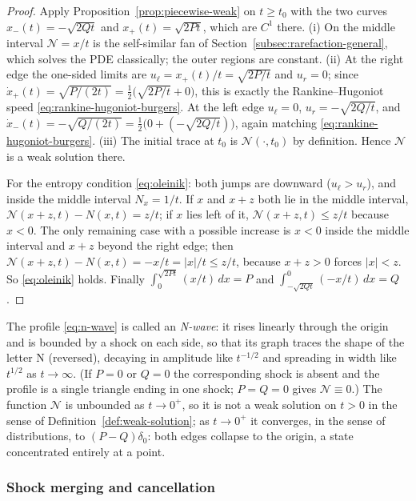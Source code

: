 \begin{proof}
Apply Proposition~\ref{prop:piecewise-weak} on $t\ge t_0$ with the two
curves $x_-(t)=-\sqrt{2Qt}$ and $x_+(t)=\sqrt{2Pt}$, which are $C^1$ there.
(i) On the middle interval $\mathcal{N}=x/t$ is the self-similar fan of
Section~\ref{subsec:rarefaction-general}, which solves the PDE
classically; the outer regions are constant. (ii) At the right edge the
one-sided limits are $u_\ell = x_+(t)/t = \sqrt{2P/t}$ and $u_r=0$; since
$\dot x_+(t) = \sqrt{P/(2t)} = \tfrac12\big(\sqrt{2P/t}+0\big)$, this is
exactly the Rankine--Hugoniot speed \eqref{eq:rankine-hugoniot-burgers}.
At the left edge $u_\ell=0$, $u_r=-\sqrt{2Q/t}$, and $\dot x_-(t) =
-\sqrt{Q/(2t)} = \tfrac12\big(0+(-\sqrt{2Q/t})\big)$, again matching
\eqref{eq:rankine-hugoniot-burgers}. (iii) The initial trace at $t_0$ is
$\mathcal{N}(\cdot,t_0)$ by definition. Hence $\mathcal{N}$ is a weak solution there.

For the entropy condition \eqref{eq:oleinik}: both jumps are downward
($u_\ell>u_r$), and inside the middle interval $N_x=1/t$. If $x$ and $x+z$
both lie in the middle interval, $\mathcal{N}(x+z,t)-N(x,t)=z/t$; if $x$ lies left of
it, $\mathcal{N}(x+z,t)\le z/t$ because $x<0$. The only remaining case with a
possible increase is $x<0$ inside the middle interval and $x+z$ beyond the
right edge; then $\mathcal{N}(x+z,t)-N(x,t)=-x/t=|x|/t\le z/t$, because
$x+z>0$ forces $|x|<z$. So \eqref{eq:oleinik} holds. Finally $\int_0^{\sqrt{2Pt}}(x/t)\,dx=P$
and $\int_{-\sqrt{2Qt}}^0 (-x/t)\,dx=Q$.
\end{proof}

The profile \eqref{eq:n-wave} is called an \emph{N-wave}: it rises
linearly through the origin and is bounded by a shock on each side, so
that its graph traces the shape of the letter N (reversed), decaying in
amplitude like $t^{-1/2}$ and spreading in width like $t^{1/2}$ as
$t\to\infty$. (If $P=0$ or $Q=0$ the corresponding shock is absent and
the profile is a single triangle ending in one shock; $P=Q=0$ gives
$\mathcal{N}\equiv0$.) The function $\mathcal{N}$ is unbounded as $t\to0^+$, so it is not a
weak solution on $t>0$ in the sense of Definition~\ref{def:weak-solution};
as $t\to0^+$ it converges, in the sense of distributions, to $(P-Q)\delta_0$:
both edges collapse to the origin, a state concentrated entirely at a
point.

\subsubsection{Shock merging and cancellation}
\label{subsubsec:shock-merging}

